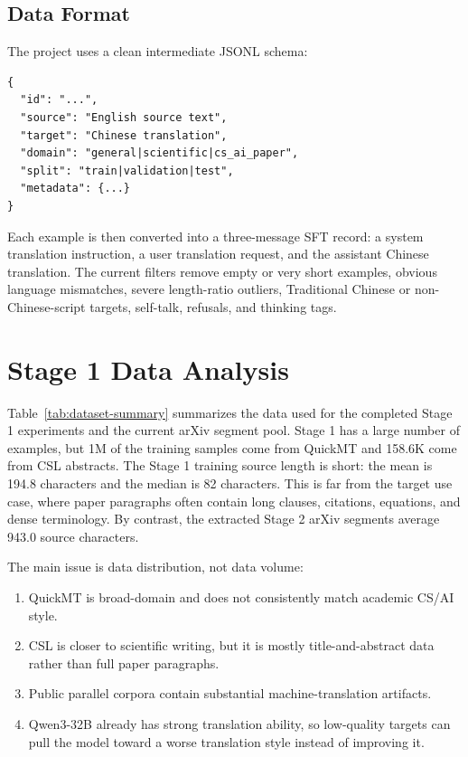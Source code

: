 \documentclass{article}
\begin{document}
\subsection{Data Format}

The project uses a clean intermediate JSONL schema:

\begin{verbatim}
{
  "id": "...",
  "source": "English source text",
  "target": "Chinese translation",
  "domain": "general|scientific|cs_ai_paper",
  "split": "train|validation|test",
  "metadata": {...}
}
\end{verbatim}

Each example is then converted into a three-message SFT record: a system translation instruction, a user translation request, and the assistant Chinese translation. The current filters remove empty or very short examples, obvious language mismatches, severe length-ratio outliers, Traditional Chinese or non-Chinese-script targets, self-talk, refusals, and thinking tags.

\section{Stage 1 Data Analysis}

Table~\ref{tab:dataset-summary} summarizes the data used for the completed Stage 1 experiments and the current arXiv segment pool. Stage 1 has a large number of examples, but 1M of the training samples come from QuickMT and 158.6K come from CSL abstracts. The Stage 1 training source length is short: the mean is 194.8 characters and the median is 82 characters. This is far from the target use case, where paper paragraphs often contain long clauses, citations, equations, and dense terminology. By contrast, the extracted Stage 2 arXiv segments average 943.0 source characters.

\begin{table}[htbp]
    \centering
    \caption{Main dataset statistics used in this report.}
    \label{tab:dataset-summary}
    \resizebox{\textwidth}{!}{}
\end{table}

The main issue is data distribution, not data volume:

\begin{enumerate}
    \item QuickMT is broad-domain and does not consistently match academic CS/AI style.
    \item CSL is closer to scientific writing, but it is mostly title-and-abstract data rather than full paper paragraphs.
    \item Public parallel corpora contain substantial machine-translation artifacts.
    \item Qwen3-32B already has strong translation ability, so low-quality targets can pull the model toward a worse translation style instead of improving it.
\end{enumerate}
\end{document}
